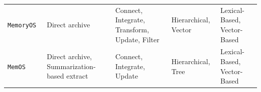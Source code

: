 \begin{table}[]
{\begin{tabular}{l|l|l|l|l}
      {\tt MemoryOS}~\cite{kang2025memory} & Direct archive & Connect, Integrate, Transform, Update, Filter & Hierarchical, Vector & Lexical-Based, Vector-Based \\
      {\tt MemOS}~\cite{li2025memos} & Direct archive, Summarization-based extract & Connect, Integrate, Update & Hierarchical, Tree & Lexical-Based, Vector-Based \\
     \bottomrule
  \end{tabular}
  }
\end{table}



